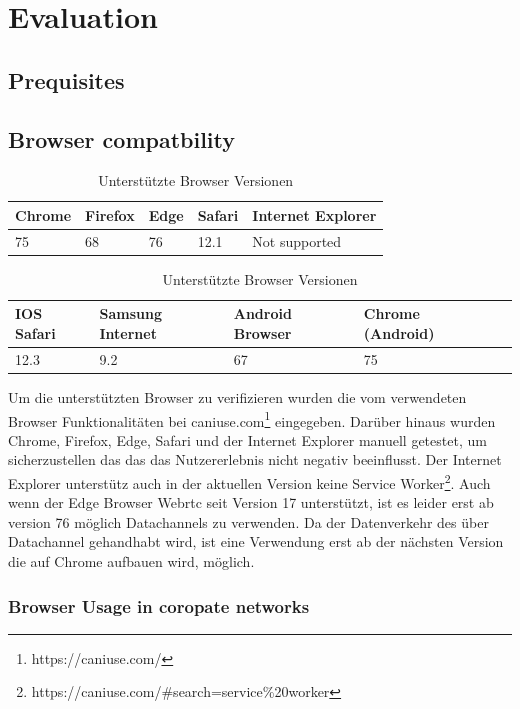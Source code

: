 \chapter{Evaluation}\label{ch:evaluation}

\section{Prequisites}

\section{Browser compatbility}
\begin{table}[!htb]
\begin{center}

	\begin{tabular}{|l|l|l|l|l|}
		\hline
		Chrome & Firefox & Edge & Safari & Internet Explorer	  \\ \hline
		75 	   & 68 	  & 76	 & 12.1	  & Not supported    				\\ \hline
	\end{tabular}
	
	\begin{tabular}{|l|l|l|l|l|}
		\hline
		IOS Safari & Samsung Internet & Android Browser	& Chrome (Android) \\ \hline
		12.3	   & 9.2				  & 67				& 75  \\ \hline
	\end{tabular}

	\caption{Unterstützte Browser Versionen}
\end{center}

Um die unterstützten Browser zu verifizieren wurden die vom \pTp \cdn verwendeten Browser Funktionalitäten bei caniuse.com\footnote{https://caniuse.com/} eingegeben. Darüber hinaus wurden Chrome, Firefox, Edge, Safari und der Internet Explorer manuell getestet, um sicherzustellen das das \pTp \cdn das Nutzererlebnis nicht negativ beeinflusst. Der Internet Explorer unterstütz auch in der aktuellen Version keine Service Worker\footnote{https://caniuse.com/#search=service\%20worker}. Auch wenn der Edge Browser Webrtc seit Version 17 unterstützt, ist es leider erst ab version 76 möglich Datachannels zu verwenden. Da der Datenverkehr des \pTp \cdns über Datachannel gehandhabt wird, ist eine Verwendung erst ab der nächsten Version die auf Chrome aufbauen wird, möglich.
\end{table}

\subsection{Browser Usage in coropate networks}

